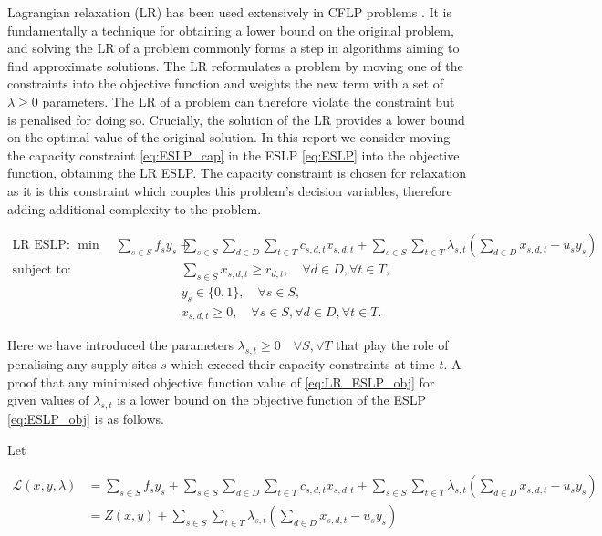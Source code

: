 Lagrangian relaxation (LR) has been used extensively in CFLP problems \cite{cornuejols1991comparison}. It is 
fundamentally a technique for obtaining a lower bound on the original problem, and solving the LR
of a problem commonly forms a step in algorithms aiming to find approximate solutions.
The LR reformulates a problem by moving one of the constraints into the objective function and 
weights the new term with a set of $\lambda \geq 0$ parameters. The LR of a problem can therefore violate the
constraint but is penalised for doing so. 
Crucially, the solution of the LR provides a lower bound on the optimal value of the original solution. 
In this report we consider moving the capacity constraint \ref{eq:ESLP_cap} in the ESLP \ref{eq:ESLP} into 
the objective function, obtaining the LR ESLP. The capacity constraint is chosen for 
relaxation as it is this constraint which couples this problem's decision variables,
therefore adding additional complexity to the problem.

\begin{subequations}\label{eq:LR_ESLP}
    \begin{align}
    \text{LR ESLP: } \min \quad \sum_{s \in S} f_s y_s + &\sum_{s \in S}\sum_{d \in D}\sum_{t \in T} c_{s,d,t} x_{s,d,t} + \sum_{s \in S}\sum_{t \in T} \lambda_{s,t} \left( \sum_{d \in D} x_{s,d,t} - u_s y_s \right) \label{eq:LR_ESLP_obj} \\
    \text{subject to: } &\sum_{s \in S} x_{s,d,t} \geq r_{d,t}, \quad \forall d \in D, \forall t \in T, \label{eq:LR_ESLP_dem} \\
    &y_s \in \{0, 1\}, \quad \forall s \in S, \label{eq:LR_ESLP_y} \\
    &x_{s,d,t} \geq 0, \quad \forall s \in S, \forall d \in D, \forall t \in T. \label{eq:LR_ESLP_x}
    \end{align}
\end{subequations}


Here we have introduced the parameters $\lambda_{s, t} \geq 0 \quad \forall S, \forall T$ that play the role of penalising any supply sites $s$ which exceed their capacity constraints at time $t$.
A proof that any minimised objective function value of \ref{eq:LR_ESLP_obj} for given values of $\lambda_{s,t}$ is a lower bound on the objective function of the ESLP \ref{eq:ESLP_obj} is as follows.\par


Let

\begin{equation}\label{eq:Lagrangian}
    \begin{aligned}
        \mathcal{L}(x,y,\lambda) &= \sum_{s \in S} f_s y_s + \sum_{s \in S}\sum_{d \in D}\sum_{t \in T} c_{s,d,t} x_{s,d,t} + \sum_{s \in S}\sum_{t \in T} \lambda_{s,t} \left( \sum_{d \in D} x_{s,d,t} - u_s y_s \right) \\
        &= Z(x, y) + \sum_{s \in S}\sum_{t \in T} \lambda_{s,t} \left( \sum_{d \in D} x_{s,d,t} - u_s y_s \right)
    \end{aligned}    
\end{equation}

